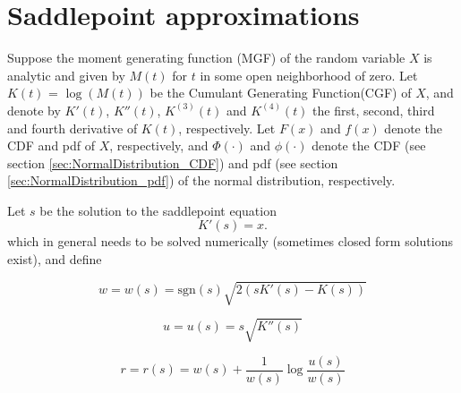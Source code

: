\newpage
\section{Saddlepoint approximations}
%

Suppose the moment generating function (MGF) of the random variable $X$ is analytic and given by $M(t)$ for $t$ in some open
neighborhood of zero. Let $K(t)$ = $\log (M(t))$  be the Cumulant Generating Function(CGF) of $X$, and denote by $K'(t)$, $K''(t)$, $K^{(3)}(t)$ and $K^{(4)}(t)$ the 
first, second, third and fourth derivative of $K(t)$, respectively. Let $F(x)$ and $f(x)$ denote the CDF and pdf of $X$, respectively, and $\Phi(\cdot)$ and $\phi(\cdot)$ denote the CDF (see section \ref{sec:NormalDistribution_CDF}) and pdf (see section \ref{sec:NormalDistribution_pdf}) of the normal distribution, respectively.


Let $s$ be the solution to the saddlepoint equation 
\begin{equation} 
	K'(s)=x. \label{eq:saddlepoint_s}
\end{equation}
which in general needs to be solved numerically (sometimes closed form solutions exist), and define

\begin{equation}
	w = w(s) = \text{sgn}(s) \sqrt{2 (s K'(s) - K(s))} \label{eq:saddlepoint_w}
\end{equation}


\begin{equation}
	u = u(s) = s \sqrt{K''(s)}  \label{eq:saddlepoint_u}
\end{equation}


\begin{equation}
	r = r(s) = w(s) + \frac{1}{w(s)} \log \frac{u(s)}{w(s)}  \label{eq:saddlepoint_r}
\end{equation}



